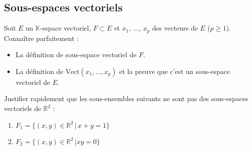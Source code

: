 \documentclass[a4paper,twoside,french,10pt]{VcCours}
\begin{document}
\medskip


\subsection{Sous-espaces vectoriels}


\begin{ptc}{}
	Soit $E$ un $\mathbb{K}$-espace vectoriel, $F \subset E$ et $x_1$, $\ldots$, $x_p$ des vecteurs de $E$ ($p \geq 1$). Connaître parfaitement :
\begin{itemize}
\item La définition de sous-espace vectoriel de $F$.
\item La définition de $\textrm{Vect}(x_1, \ldots, x_p)$ et la preuve que c'est un sous-espace vectoriel de $E$.
\end{itemize}
\end{ptc}

%
%
%
%
%
%
%

\medskip

\begin{Exercice}{}\end{Exercice} Justifier rapidement que les sous-ensembles suivants ne sont pas des sous-espaces vectoriels de $\mathbb{R}^2$ :

\begin{enumerate}
\item $F_1 = \lbrace (x,y) \in \mathbb{R}^2 \, \vert \, x+y=1 \rbrace $
\item $F_2 = \lbrace (x,y) \in \mathbb{R}^2 \, \vert xy=0 \rbrace $
\end{enumerate}
\end{document}

